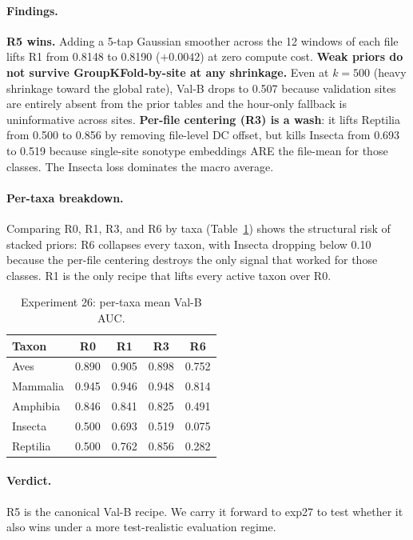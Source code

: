 \paragraph{Findings.} \textbf{R5 wins.} Adding a 5-tap Gaussian smoother
across the 12 windows of each file lifts R1 from 0.8148 to 0.8190
($+0.0042$) at zero compute cost. \textbf{Weak priors do not survive
GroupKFold-by-site at any shrinkage.} Even at $k{=}500$ (heavy
shrinkage toward the global rate), Val-B drops to 0.507 because
validation sites are entirely absent from the prior tables and the
hour-only fallback is uninformative across sites. \textbf{Per-file
centering (R3) is a wash}: it lifts Reptilia from 0.500 to 0.856 by
removing file-level DC offset, but kills Insecta from 0.693 to 0.519
because single-site sonotype embeddings ARE the file-mean for those
classes. The Insecta loss dominates the macro average.

\paragraph{Per-taxa breakdown.} Comparing R0, R1, R3, and R6 by taxa
(Table~\ref{tab:exp26-taxa}) shows the structural risk of stacked
priors: R6 collapses every taxon, with Insecta dropping below 0.10
because the per-file centering destroys the only signal that worked
for those classes. R1 is the only recipe that lifts every active
taxon over R0.

\begin{table}[h]
\centering
\caption{Experiment 26: per-taxa mean Val-B AUC.}
\label{tab:exp26-taxa}
\begin{tabular}{lcccc}
\hline
\textbf{Taxon} & \textbf{R0} & \textbf{R1} & \textbf{R3} & \textbf{R6} \\
\hline
Aves      & 0.890 & 0.905 & 0.898 & 0.752 \\
Mammalia  & 0.945 & 0.946 & 0.948 & 0.814 \\
Amphibia  & 0.846 & 0.841 & 0.825 & 0.491 \\
Insecta   & 0.500 & 0.693 & 0.519 & 0.075 \\
Reptilia  & 0.500 & 0.762 & 0.856 & 0.282 \\
\hline
\end{tabular}
\end{table}

\paragraph{Verdict.} R5 is the canonical Val-B recipe. We carry it
forward to exp27 to test whether it also wins under a more
test-realistic evaluation regime.

